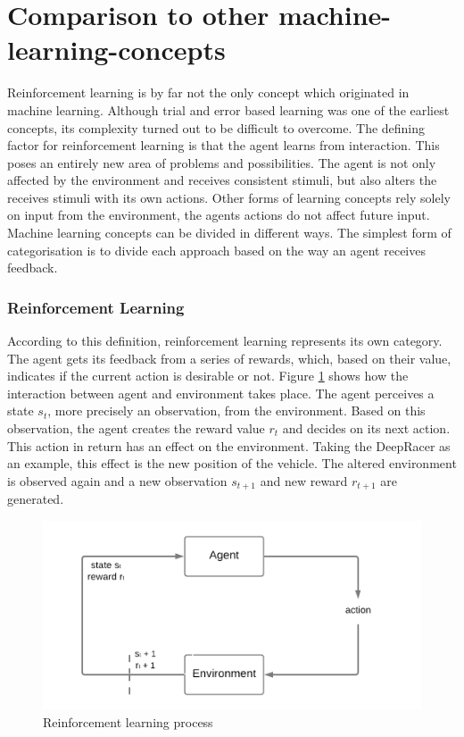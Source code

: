 \section{Comparison to other machine-learning-concepts}
Reinforcement learning is by far not the only concept which originated in machine learning. Although trial and error based learning was one of the earliest concepts, its complexity turned out to be difficult to overcome. The defining factor for reinforcement learning is that the agent learns from interaction. This poses an entirely new area of problems and possibilities. The agent is not only affected by the environment and receives consistent stimuli, but also alters the receives stimuli with its own actions. Other forms of learning concepts rely solely on input from the environment, the agents actions do not affect future input. Machine learning concepts can be divided in different ways. The simplest form of categorisation is to divide each approach based on the way an agent receives feedback.

\subsubsection{Reinforcement Learning}
According to this definition, reinforcement learning represents its own category. The agent gets its feedback from a series of rewards, which, based on their value, indicates if the current action is desirable or not. Figure \ref{fig:rl-concept} shows how the interaction between agent and environment takes place. The agent perceives a state \( s_t \), more precisely an observation, from the environment. Based on this observation, the agent creates the reward value \( r_t \) and decides on its next action. This action in return has an effect on the environment. Taking the DeepRacer as an example, this effect is the new position of the vehicle. The altered environment is observed again and a new observation \( s_{t+1} \) and new reward \( r_{t+1} \) are generated.

\begin{figure}
    \centering
    \includegraphics[width=.85\textwidth]{images/Dipl-Concept.png}
    \caption{Reinforcement learning process}
    \label{fig:rl-concept}
\end{figure}


